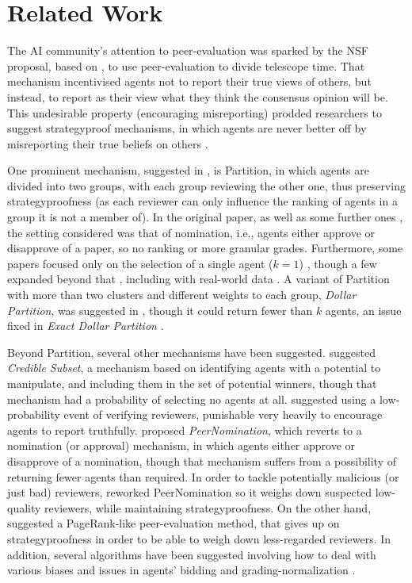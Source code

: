 \documentclass[letterpaper]{article}
\begin{document}
\section{Related Work}\label{relatedWork}

The AI community's attention to peer-evaluation was sparked by the NSF proposal, based on \citet{MS09}, to use peer-evaluation to divide telescope time. That mechanism incentivised agents not to report their true views of others, but instead, to report as their view what they think the consensus opinion will be. This undesirable property (encouraging misreporting) prodded researchers to suggest strategyproof mechanisms, in which agents are never better off by misreporting their true beliefs on others \cite{Sha22}.

One prominent mechanism, suggested in \citet{AFPT11}, is Partition, in which agents are divided into two groups, with each group reviewing the other one, thus preserving strategyproofness (as each reviewer can only influence the ranking of agents in a group it is not a member of). In the original paper, as well as some further ones \cite{HM13a}, the setting considered was that of nomination, i.e., agents either approve or disapprove of a paper, so no ranking or more granular grades. Furthermore, some papers focused only on the selection of a single agent ($k=1$) \cite{HM13a,FK15,BNV14}, though a few expanded beyond that \cite{BFK17}, including with real-world data \cite{XZSS19}. A variant of Partition with more than two clusters and different weights to each group, \emph{Dollar Partition}, was suggested in \citet{ALMRW16}, though it could return fewer than $k$ agents, an issue fixed in \emph{Exact Dollar Partition} \cite{ALMRW19}.

Beyond Partition, several other mechanisms have been suggested. \citet{KLMP15} suggested \emph{Credible Subset}, a mechanism based on identifying agents with a potential to manipulate, and including them in the set of potential winners, though that mechanism had a probability of selecting no agents at all. \citet{GWL19} suggested using a low-probability event of verifying reviewers, punishable very heavily to encourage agents to report truthfully. \citet{MTZ20} proposed \emph{PeerNomination}, which reverts to a nomination (or approval) mechanism, in which agents either approve or disapprove of a nomination, though that mechanism suffers from a possibility of returning fewer agents than required. In order to tackle potentially malicious (or just bad) reviewers, \citet{LMTZ23} reworked PeerNomination so it weighs down suspected low-quality reviewers, while maintaining strategyproofness. On the other hand, \citet{Wal14} suggested a PageRank-like peer-evaluation method, that gives up on strategyproofness in order to be able to weigh down less-regarded reviewers. In addition, several algorithms have been suggested involving how to deal with various biases and issues in agents' bidding and grading-normalization \cite{NSP19,SSS19,WS19}.
\end{document}

